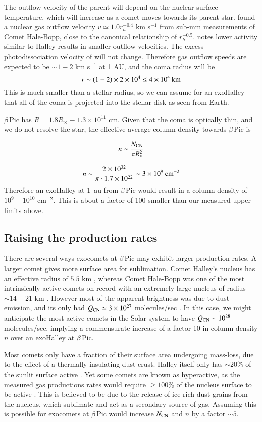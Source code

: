 \documentclass{aa}
\newcommand{\kms}{km s$^{-1}$}
\newcommand{\bp}{$\beta$\,Pic}
\begin{document}
The outflow velocity of the parent  will depend on the nuclear surface temperature, which will increase as a comet moves towards its parent star.
%
\citet{Biver2002} found a nuclear gas outflow velocity $v\simeq1.0  r_h^{-0.4}$ \kms{} from sub-mm measurements of Comet Hale-Bopp, close to the canonical relationship of $r_h^{-0.5}$.
%
\citet{Harris2002} notes lower activity similar to Halley results in smaller outflow velocities.
%
The excess photodissociation velocity of  will not change.
%
Therefore gas outflow speeds are expected to be $\sim 1-2$ \kms{} at 1 AU, and the  coma radius will be
%
$$r\sim (1-2) \times 2\times 10^{4} \leq 4\times 10^{4}\:{\rm km}$$
%
This is much smaller than a stellar radius, so we can assume for an exoHalley that all of the coma is projected into the stellar disk as seen from Earth.

\bp{} has $R=1.8R_\odot\equiv 1.3\times 10^{11}$ cm.
%
Given that the coma is optically thin, and we do not resolve the star, the effective average column density towards \bp{} is 

$$n\sim\frac{N_{\ce{CN}}}{\pi R_*^2}$$

$$n\sim\frac{2\times10^{32}}{\pi\cdot 1.7\times10^{22}}\sim 3\times10^{9}\:{\rm cm^{-2}}$$
Therefore an exoHalley at 1~au from \bp{} would result in a  column density of $10^{9}-10^{10}$ cm$^{-2}$.
%
This is about a factor of 100 smaller than our measured upper limits above.

\subsection{Raising the \texorpdfstring{}{CN} production rates}

There are several ways exocomets at \bp{} may exhibit larger  production rates.
%
A larger comet gives more surface area for sublimation.
%
 Comet Halley's nucleus has an effective radius of $5.5$ km \citep{Keller1987}, whereas Comet Hale-Bopp was one of the most intrinsically active comets on record with an extremely large nucleus of radius $\sim 14-21$ km \citep{Weaver1997}.
%
However most of the apparent brightness was due to dust emission, and its only had $Q_{\ce{CN}}\simeq 3\times10^{27}$ molecules/sec \citep{Schleicher2024}.
%
In this case, we might anticipate the most active comets in the Solar system to have $Q_{\ce{CN}}\sim 10^{28}$ molecules/sec, implying a commensurate increase of a factor 10 in column density $n$ over an exoHalley at \bp{}.

Most comets only have a fraction of their surface area undergoing mass-loss, due to the effect of a thermally insulating dust crust.
%
Halley itself only has $\sim20$\% of the sunlit surface active \citep{Keller1987}.
%
Yet some comets are known as hyperactive, as the measured gas productions rates would require $\geq 100$\% of the nucleus surface to be active \citep{Sunshine2021}.
%
This is believed to be due to the release of ice-rich dust grains from the nucleus, which sublimate and act as a secondary source of gas.
%
Assuming this is possible for exocomets at \bp{} would increase $N_{\ce{CN}}$ and $n$ by a factor $\sim 5$.
\end{document}
